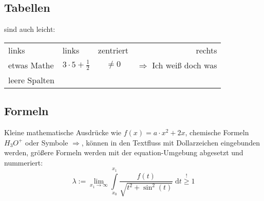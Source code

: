 	\subsection{Tabellen}
	sind auch leicht:\\
	\begin{tabular}{l||lc|r}				%
		links 			& links & zentriert 	& rechts\\		%
		etwas Mathe 	& $3 \cdot 5 + \frac{1}{2}$ & $\ne 0$ & $\Rightarrow$ Ich weiß doch was\\ \hline 	%
		leere Spalten 	& & & \\
	\end{tabular}


	\subsection{Formeln}
	Kleine mathematische Ausdrücke wie $f(x) = a \cdot x^2 + 2x$, chemische Formeln $H_3O^+$ oder Symbole $\Rightarrow$, können in den Textfluss
	mit Dollarzeichen eingebunden werden, größere Formeln werden mit der equation-Umgebung abgesetzt und nummeriert:
	\begin{equation}
		\lambda := \lim\limits_{x_1 \rightarrow \infty}    \int\limits_{x_0}^{x_1} \frac{ f(t) }{ \sqrt{t^2 + \sin^2(t) } } \; \mathrm dt \stackrel{!}\ge 1
	\end{equation}

